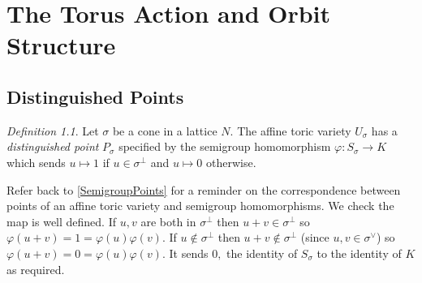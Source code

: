 \documentclass[BSc]{usydthesis}
\numberwithin{equation}{chapter}
\theoremstyle{remark}
\newtheorem{Definition}[equation]{Definition}
\newcommand{\V}{\vee}
\begin{document}
\chapter{The Torus Action and Orbit Structure}

\section{Distinguished Points}

\begin{Definition}
Let $\sigma$ be a cone in a lattice $N.$ The affine toric variety $U_{\sigma}$ has a {\em distinguished point} $P_{\sigma}$ specified by the semigroup homomorphism $\varphi: S_{\sigma} \to K$ which sends $u\mapsto 1$ if $u\in \sigma^{\perp}$ and $u\mapsto 0$ otherwise.
\end{Definition}
Refer back to \ref{SemigroupPoints} for a reminder on the correspondence between points of an affine toric variety and semigroup homomorphisms. We check the map is well defined. If $u,v$ are both in $\sigma^{\perp}$ then $u+v\in \sigma^{\perp}$ so $\varphi(u+v)=1=\varphi(u) \varphi(v).$ If $u\notin \sigma^{\perp}$ then $u+v \notin \sigma^{\perp}$ (since $u,v \in \sigma^{\V}$) so $\varphi(u+v)=0=\varphi(u)\varphi(v).$ It sends $0,$ the identity of $S_{\sigma}$ to the identity of $K$ as required. 

~
\end{document}
